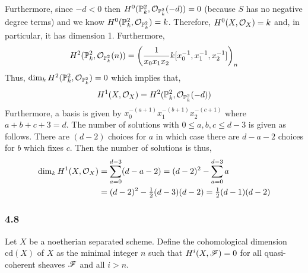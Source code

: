 \documentclass[12pt]{article}
\begin{document}
\begin{center}
\end{center}
Furthermore, since $-d < 0$ then $H^0(\mathbb{P}^2_k, \mathcal{O}_{\mathbb{P}^2_k}(-d)) = 0$ (because $S$ has no negative degree terms) and we know $H^0(\mathbb{P}^2_k, \mathcal{O}_{\mathbb{P}^2_k}) = k$. Therefore, $H^0(X, \mathcal{O}_{X}) = k$ and, in particular, it has dimension 1. Furthermore, 
\[ H^2(\mathbb{P}^2_k, \mathcal{O}_{\mathbb{P}^2_k}(n)) = \left( \frac{1}{x_0 x_1 x_2} k[x_0^{-1}, x_1^{-1}, x_2^{-1}] \right)_n \]
Thus, $\dim_k H^2(\mathbb{P}^2_k, \mathcal{O}_{\mathbb{P}^2_k}) = 0$ which implies that,
\[ H^1(X, \mathcal{O}_{X}) = H^2(\mathbb{P}^2_k, \mathcal{O}_{\mathbb{P}^2_k}(-d)) \]
Furthermore, a basis is given by $x_0^{-(a + 1)} x_1^{-(b + 1)} x_2^{-(c + 1)}$ where $a + b + c + 3 = d$. The number of solutions with $0 \le a,b,c \le d - 3$ is given as follows. There are $(d - 2)$ choices for $a$ in which case there are $d - a - 2$ choices for $b$ which fixes $c$. Then the number of solutions is thus,
\begin{align*}
\dim_k H^1(X, \mathcal{O}_{X}) & = \sum_{a = 0}^{d - 3} (d - a - 2) = (d - 2)^2 - \sum_{a = 0}^{d - 3} a 
\\
& = (d - 2)^2 - \tfrac{1}{2} (d - 3)(d - 2) = \tfrac{1}{2} (d - 1)(d - 2)
\end{align*}

\subsubsection{4.8}

\newcommand{\cd}[1]{\mathrm{cd}\left( #1 \right)}
\renewcommand{\U}{\mathfrak{U}}

Let $X$ be a noetherian separated scheme. Define the cohomological dimension $\cd{X}$ of $X$ as the minimal integer $n$ such that $H^i(X, \mathscr{F}) = 0$ for all quasi-coherent sheaves $\mathscr{F}$ and all $i  > n$. 
\end{document}
